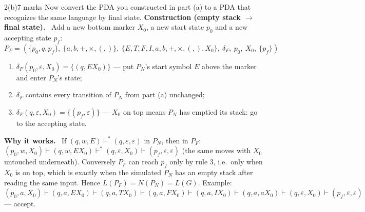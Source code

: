 \documentclass[10.5pt,a4paper]{article}
\newcommand{\ansh}[1]{\textbf{\color{exborder}#1}\ }
\newcommand{\eps}{\varepsilon}
\begin{document}
\begin{qa}{2(b)}{7 marks}
Now convert the PDA you constructed in part (a) to a PDA that recognizes the same language by final state.
\tcblower
\ansh{Construction (empty stack $\to$ final state).} Add a new bottom marker $X_0$, a new start state $p_0$ and a new accepting state $p_f$:
\[P_F=(\{p_0,q,p_f\},\ \{a,b,+,\times,(,)\},\ \{E,T,F,I,a,b,+,\times,(,),X_0\},\ \delta_F,\ p_0,\ X_0,\ \{p_f\})\]
\begin{enumerate}
\item $\delta_F(p_0,\eps,X_0)=\{(q,EX_0)\}$ --- put $P_N$'s start symbol $E$ above the marker and enter $P_N$'s state;
\item $\delta_F$ contains every transition of $P_N$ from part (a) unchanged;
\item $\delta_F(q,\eps,X_0)=\{(p_f,\eps)\}$ --- $X_0$ on top means $P_N$ has emptied its stack: go to the accepting state.
\end{enumerate}
\begin{center}
\end{center}
\ansh{Why it works.} If $(q,w,E)\vdash^*(q,\eps,\eps)$ in $P_N$, then in $P_F$:
$(p_0,w,X_0)\vdash(q,w,EX_0)\vdash^*(q,\eps,X_0)\vdash(p_f,\eps,\eps)$ (the same moves with $X_0$ untouched underneath). Conversely $P_F$ can
reach $p_f$ only by rule 3, i.e.\ only when $X_0$ is on top, which is exactly when the simulated $P_N$ has an empty stack after reading the
same input. Hence $L(P_F)=N(P_N)=L(G)$. Example: $(p_0,a,X_0)\vdash(q,a,EX_0)\vdash(q,a,TX_0)\vdash(q,a,FX_0)\vdash(q,a,IX_0)\vdash(q,a,aX_0)
\vdash(q,\eps,X_0)\vdash(p_f,\eps,\eps)$ --- accept.
\end{qa}
\end{document}
